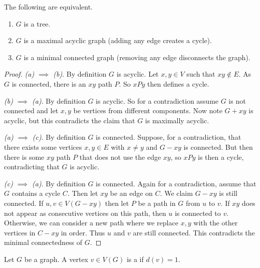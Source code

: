 \begin{example}
\begin{center}
\begin{tikzpicture}[x=0.75pt,y=0.75pt,yscale=-1,xscale=1]
\end{tikzpicture}

	\end{center}
\end{example}



\begin{proposition}
	The following are equivalent.
	\begin{enumerate}[label=(\alph*)]
		\item $G$ is a tree.
		\item $G$ is a maximal acyclic graph (adding any edge creates a cycle).
		\item $G$ is a minimal connected graph (removing any edge disconnects the graph).
	\end{enumerate}
\end{proposition}
\begin{proof}
	\emph{(a) $\implies$ (b)}. By definition $G$ is acyclic. Let $x, y \in V$ such that $xy \not \in E$. As $G$ is connected, there is an $xy$ path $P$. So $xPy$ then defines a cycle.

	\emph{(b) $\implies$ (a)}. By definition $G$ is acyclic. 
	So for a contradiction assume $G$ is not connected and let $x, y$ be vertices from different components. Now note $G + xy$ is acyclic, but this contradicts the claim that $G$ is maximally acyclic.

	\emph{(a) $\implies$ (c)}. By definition $G$ is connected. Suppose, for a contradiction, that there exists some vertices $x, y \in E$ with $x \neq y$ and $G - xy$ is connected. But then there is some $xy$ path $P$ that does not use the edge $xy$, so $xPy$ is then a cycle, contradicting that $G$ is acyclic.

	\emph{(c) $\implies$ (a)}. By definition $G$ is connected. Again for a contradiction, assume that $G$ contains a cycle $C$. Then let $xy$ be an edge on $C$. We claim $G - xy$ is still connected. If $u, v \in V(G - xy)$ then let $P$ be a path in $G$ from $u$ to $v$. If $xy$ does not appear as consecutive vertices on this path, then $u$ is connected to $v$. Otherwise, we can consider a new path where we replace $x,y$ with the other vertices in $C - xy$ in order. Thus $u$ and $v$ are still connected. This contradicts the minimal connectedness of $G$. 

\end{proof}

\begin{definition}[Leaf]
	Let $G$ be a graph. A vertex $v \in V(G)$ is a  if $d(v) = 1$.
\end{definition}

